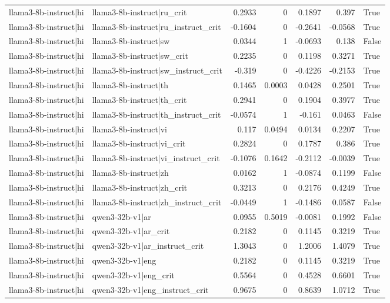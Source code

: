 \begin{table}
\begin{tabular}{l l r r r r l}
llama3-8b-instruct|hi & llama3-8b-instruct|ru_crit & 0.2933 & 0 & 0.1897 & 0.397 & True \\
llama3-8b-instruct|hi & llama3-8b-instruct|ru_instruct_crit & -0.1604 & 0 & -0.2641 & -0.0568 & True \\
llama3-8b-instruct|hi & llama3-8b-instruct|sw & 0.0344 & 1 & -0.0693 & 0.138 & False \\
llama3-8b-instruct|hi & llama3-8b-instruct|sw_crit & 0.2235 & 0 & 0.1198 & 0.3271 & True \\
llama3-8b-instruct|hi & llama3-8b-instruct|sw_instruct_crit & -0.319 & 0 & -0.4226 & -0.2153 & True \\
llama3-8b-instruct|hi & llama3-8b-instruct|th & 0.1465 & 0.0003 & 0.0428 & 0.2501 & True \\
llama3-8b-instruct|hi & llama3-8b-instruct|th_crit & 0.2941 & 0 & 0.1904 & 0.3977 & True \\
llama3-8b-instruct|hi & llama3-8b-instruct|th_instruct_crit & -0.0574 & 1 & -0.161 & 0.0463 & False \\
llama3-8b-instruct|hi & llama3-8b-instruct|vi & 0.117 & 0.0494 & 0.0134 & 0.2207 & True \\
llama3-8b-instruct|hi & llama3-8b-instruct|vi_crit & 0.2824 & 0 & 0.1787 & 0.386 & True \\
llama3-8b-instruct|hi & llama3-8b-instruct|vi_instruct_crit & -0.1076 & 0.1642 & -0.2112 & -0.0039 & True \\
llama3-8b-instruct|hi & llama3-8b-instruct|zh & 0.0162 & 1 & -0.0874 & 0.1199 & False \\
llama3-8b-instruct|hi & llama3-8b-instruct|zh_crit & 0.3213 & 0 & 0.2176 & 0.4249 & True \\
llama3-8b-instruct|hi & llama3-8b-instruct|zh_instruct_crit & -0.0449 & 1 & -0.1486 & 0.0587 & False \\
llama3-8b-instruct|hi & qwen3-32b-v1|ar & 0.0955 & 0.5019 & -0.0081 & 0.1992 & False \\
llama3-8b-instruct|hi & qwen3-32b-v1|ar_crit & 0.2182 & 0 & 0.1145 & 0.3219 & True \\
llama3-8b-instruct|hi & qwen3-32b-v1|ar_instruct_crit & 1.3043 & 0 & 1.2006 & 1.4079 & True \\
llama3-8b-instruct|hi & qwen3-32b-v1|eng & 0.2182 & 0 & 0.1145 & 0.3219 & True \\
llama3-8b-instruct|hi & qwen3-32b-v1|eng_crit & 0.5564 & 0 & 0.4528 & 0.6601 & True \\
llama3-8b-instruct|hi & qwen3-32b-v1|eng_instruct_crit & 0.9675 & 0 & 0.8639 & 1.0712 & True \\

\end{tabular}
\end{table}
